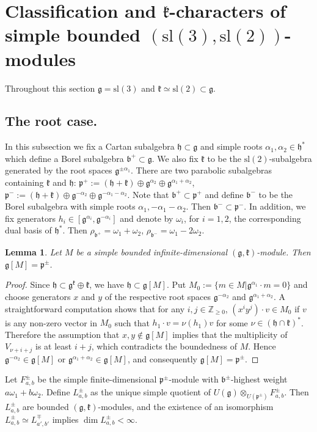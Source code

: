 \documentclass[12pt]{amsart}
\theoremstyle{plain} %
\newtheorem{lemma}[definition]{Lemma}
\renewcommand{\sl}{\mathrm{sl}}
\newcommand {\ZZ} {\mathbb {Z}}
\newcommand{\kk}{\mathfrak{k}}
\newcommand{\hh}{\mathfrak{h}}
\renewcommand{\gg}{\mathfrak{g}}
\newcommand{\bb}{\mathfrak{b}}
\newcommand{\pp}{\mathfrak{p}}
\begin{document}
\section{Classification and $\kk$-characters of simple bounded $(\sl(3),\sl(2))$-modules}\label{secKchars3-2}

Throughout this section $\gg=\sl(3)$ and $\kk\simeq\sl(2)\subset\gg$.

\subsection{The root case.}\label{subsecTheRootCase}
In this subsection we fix a Cartan subalgebra $\hh\subset\gg$ and simple roots $\alpha_1,\alpha_2\in\hh^*$ which define a Borel subalgebra $\bb^+\subset\gg$. We also fix $\kk$ to be the $\sl(2)$-subalgebra generated by the root spaces $\gg^{\pm\alpha_1}$. There are two parabolic subalgebras containing $\kk$ and $\hh$: $\pp^+:=(\hh+\kk)\oplus\gg^{\alpha_2}\oplus\gg^{\alpha_1+\alpha_2}$, $\pp^-:=(\hh+\kk)\oplus\gg^{-\alpha_2}\oplus\gg^{-\alpha_1-\alpha_2}$. Note that $\bb^+\subset\pp^+$ and define $\bb^-$ to be the Borel subalgebra with simple roots $\alpha_1,-\alpha_1-\alpha_2$. Then $\bb^-\subset\pp^-$. In addition, we fix generators $h_i\in[\gg^{\alpha_i},\gg^{-\alpha_i}]$ and denote by $\omega_i$, for $i=1,2$, the corresponding dual basis of $\hh^*$. Then $\rho_{\bb^+}=\omega_1+\omega_2$, $\rho_{\bb^-}=\omega_1-2\omega_2$.

\begin{lemma}\label{le81}
Let $M$ be a simple bounded infinite-dimensional $(\gg,\kk)$-module. Then $\gg[M]=\pp^\pm$.
\end{lemma}
\begin{proof}
Since $\hh\subset\gg^\kk\oplus\kk$, we have $\hh\subset\gg[M]$. Put $M_0:=\{m\in M| \gg^{\alpha_1}\cdot m=0\}$ and choose generators $x$ and $y$ of the respective root spaces $\gg^{-\alpha_2}$ and $\gg^{\alpha_1+\alpha_2}$. A straightforward computation shows that for any $i,j\in \ZZ_{\geq 0}$, $(x^iy^j)\cdot v\in M_0$ if $v$ is any non-zero vector in $M_0$ such that $h_1\cdot v= \nu(h_1) v$ for some $\nu\in(\hh\cap\kk)^*$. Therefore the assumption that $x,y\notin \gg[M]$ implies that the multiplicity of $V_{\nu+i+j}$ is at least $i+j$, which contradicts the boundedness of $M$. Hence $\gg^{-\alpha_2}\in\gg[M]$ or $\gg^{\alpha_1+\alpha_2}\in\gg[M]$, and consequently $\gg[M]=\pp^\pm$.
\end{proof}

Let $F_{a,b}^\pm$ be the simple finite-dimensional $\pp^\pm$-module with $\bb^\pm$-highest weight $a\omega_1+b\omega_2$. Define $L^\pm_{a,b}$ as the unique simple quotient of $U(\gg)\otimes_{U(\pp^\pm)}F^\pm_{a,b}$. Then $L^\pm_{a,b}$ are bounded $(\gg,\kk)$-modules, and the existence of an isomorphism $L^\pm_{a,b}\simeq L^\mp_{a',b'}$ implies $\dim L_{a,b}^\pm<\infty$.
\end{document}
